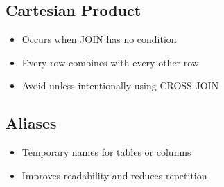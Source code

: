 \documentclass[10pt]{article}
\begin{document}
\subsection{Cartesian Product}
\begin{itemize}
\item Occurs when JOIN has no condition
\item Every row combines with every other row
\item Avoid unless intentionally using CROSS JOIN
\end{itemize}

\subsection{Aliases}
\begin{itemize}
\item Temporary names for tables or columns
\item Improves readability and reduces repetition
\end{itemize}
\end{document}
